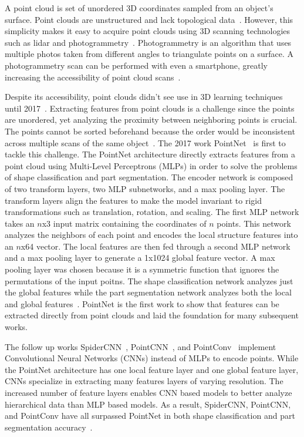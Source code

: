 A point cloud is set of unordered 3D coordinates sampled from an object's surface. Point clouds are unstructured and lack topological data~\cite{Xiao2020}. However, this simplicity makes it easy to acquire point clouds using 3D scanning technologies such as lidar and photogrammetry~\cite{Leberl2010}. Photogrammetry is an algorithm that uses multiple photos taken from different angles to triangulate points on a surface. A photogrammetry scan can be performed with even a smartphone, greatly increasing the accessibility of point cloud scans~\cite{Micheletti2015}.

Despite its accessibility, point clouds didn't see use in 3D learning techniques until 2017~\cite{Xiao2020}. Extracting features from point clouds is a challenge since the points are unordered, yet analyzing the proximity between neighboring points is crucial. The points cannot be sorted beforehand because the order would be inconsistent across multiple scans of the same object~\cite{Qi2017}. The 2017 work PointNet~\cite{Qi2017} is first to tackle this challenge. The PointNet architecture directly extracts features from a point cloud using Multi-Level Perceptrons (MLPs) in order to solve the problems of shape classification and part segmentation. The encoder network is composed of two transform layers, two MLP subnetworks, and a max pooling layer. The transform layers align the features to make the model invariant to rigid transformations such as translation, rotation, and scaling. The first MLP network takes an $n$x3 input matrix containing the coordinates of $n$ points. This network analyzes the neighbors of each point and encodes the local structure features into an $n$x64 vector. The local features are then fed through a second MLP network and a max pooling layer to generate a 1x1024 global feature vector. A max pooling layer was chosen because it is a symmetric function that ignores the permutations of the input poitns. The shape classification network analyzes just the global features while the part segmentation network analyzes both the local and global features~\cite{Qi2017}. PointNet is the first work to show that features can be extracted directly from point clouds and laid the foundation for many subsequent works.

The follow up works SpiderCNN~\cite{Xu2018}, PointCNN~\cite{Li2018}, and PointConv~\cite{Wu2019} implement Convolutional Neural Networks (CNNs) instead of MLPs to encode points. While the PointNet architecture has one local feature layer and one global feature layer, CNNs specialize in extracting many features layers of varying resolution. The increased number of feature layers enables CNN based models to better analyze hierarchical data than MLP based models. As a result, SpiderCNN, PointCNN, and PointConv have all surpassed PointNet in both shape classification and part segmentation accuracy~\cite{Wu2019}.

